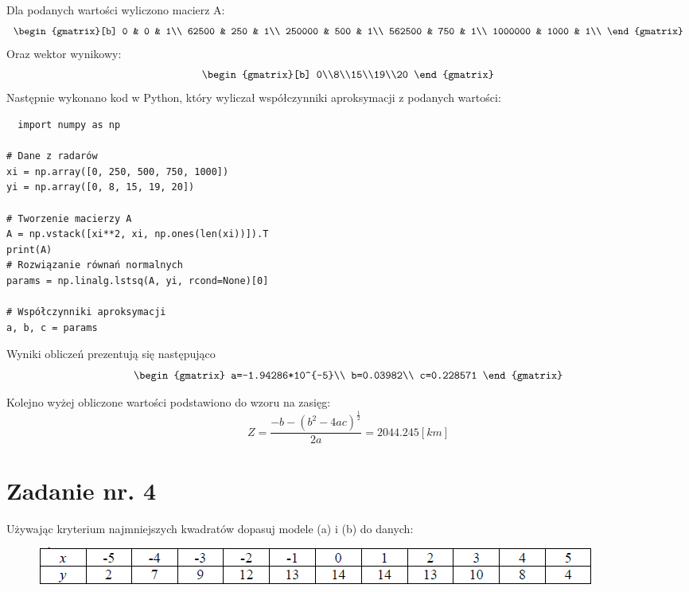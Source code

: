 \documentclass{article}
\begin{document}
Dla podanych wartości wyliczono macierz A:
\begin{equation}
  \begin{gmatrix}[b]
    0 & 0 & 1\\
    62500 & 250 & 1\\
    250000 & 500 & 1\\
    562500 & 750 & 1\\
    1000000 & 1000 & 1\\
  \end{gmatrix}
\end{equation}
Oraz wektor wynikowy:
\begin{equation}
  \begin{gmatrix}[b]
    0\\8\\15\\19\\20
  \end{gmatrix}
\end{equation}
Następnie wykonano kod w Python, który wyliczał współczynniki aproksymacji z podanych wartości:
\begin{lstlisting}
  import numpy as np

# Dane z radarów
xi = np.array([0, 250, 500, 750, 1000])
yi = np.array([0, 8, 15, 19, 20])

# Tworzenie macierzy A
A = np.vstack([xi**2, xi, np.ones(len(xi))]).T
print(A)
# Rozwiązanie równań normalnych
params = np.linalg.lstsq(A, yi, rcond=None)[0]

# Współczynniki aproksymacji
a, b, c = params
\end{lstlisting}
Wyniki obliczeń prezentują się następująco
\begin{equation}
  \begin{gmatrix}
    a=-1.94286*10^{-5}\\
    b=0.03982\\
    c=0.228571
  \end{gmatrix}
\end{equation}

Kolejno wyżej obliczone wartości podstawiono do wzoru na zasięg:
\begin{equation}
  Z = \frac{-b-(b^2-4ac)^{\frac{1}{2}}}{2a} = 2044.245[km]
\end{equation}

\section{Zadanie nr. 4}
Używając kryterium najmniejszych kwadratów dopasuj modele (a) i (b) do danych:
\begin{figure}[h]
  \includegraphics[scale=0.7]{tabelka_2.png}
  \centering
  \end{figure}
\end{document}

